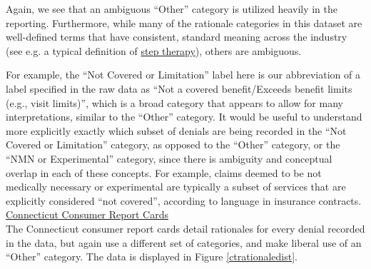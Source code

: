 \documentclass[12pt, a4paper,twoside,parskip=full]{report}
\theoremstyle{plain} %
\theoremstyle{definition} %
\theoremstyle{remark} %
\numberwithin{equation}{chapter}
\begin{document}
		\clearpage
	
		Again, we see that an ambiguous ``Other'' category is utilized heavily in the reporting. Furthermore, while many of the rationale categories in this dataset are well-defined terms that have consistent, standard meaning across the industry (see e.g. a typical definition of \href{https://en.wikipedia.org/wiki/Step_therapy}{step therapy}), others are ambiguous.
		
		For example, the ``Not Covered or Limitation'' label here is our abbreviation of a label specified in the raw data as ``Not a covered benefit/Exceeds benefit limits (e.g., visit limits)'', which is a broad category that appears to allow for many interpretations, similar to the ``Other'' category. It would be useful to understand more explicitly exactly which subset of denials are being recorded in the ``Not Covered or Limitation'' category, as opposed to the ``Other'' category, or the ``NMN or Experimental'' category, since there is ambiguity and conceptual overlap in each of these concepts. For example, claims deemed to be not medically necessary or experimental are typically a subset of services that are explicitly considered ``not covered'', according to language in insurance contracts.\\
		
		\underline{Connecticut Consumer Report Cards}\\
		
		The Connecticut consumer report cards detail rationales for every denial recorded in the data, but again use a different set of categories, and make liberal use of an ``Other'' category. The data is displayed in Figure \ref{ctrationaledist}.\\
		
\end{document}
